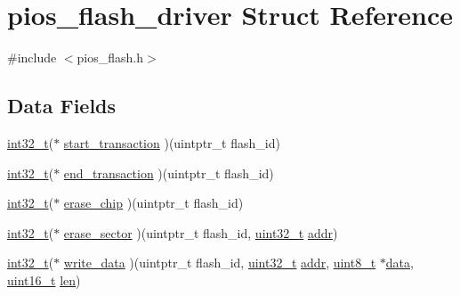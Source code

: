 \hypertarget{structpios__flash__driver}{\section{pios\-\_\-flash\-\_\-driver Struct Reference}
\label{structpios__flash__driver}
}


{\ttfamily \#include $<$pios\-\_\-flash.\-h$>$}

\subsection*{Data Fields}
\begin{DoxyCompactItemize}
\item 
\hyperlink{group___n_a_m_e_gafd12020da5a235dfcf0c3c748fb5baed}{int32\-\_\-t}($\ast$ \hyperlink{group___p_i_o_s___f_l_a_s_h_ga3128721bfc5d4b157f9c8866d10d80f0}{start\-\_\-transaction} )(uintptr\-\_\-t flash\-\_\-id)
\item 
\hyperlink{group___n_a_m_e_gafd12020da5a235dfcf0c3c748fb5baed}{int32\-\_\-t}($\ast$ \hyperlink{group___p_i_o_s___f_l_a_s_h_ga775db43adcb0c42ede668aef36016301}{end\-\_\-transaction} )(uintptr\-\_\-t flash\-\_\-id)
\item 
\hyperlink{group___n_a_m_e_gafd12020da5a235dfcf0c3c748fb5baed}{int32\-\_\-t}($\ast$ \hyperlink{group___p_i_o_s___f_l_a_s_h_ga38768b3295a563897e91191bfead95b5}{erase\-\_\-chip} )(uintptr\-\_\-t flash\-\_\-id)
\item 
\hyperlink{group___n_a_m_e_gafd12020da5a235dfcf0c3c748fb5baed}{int32\-\_\-t}($\ast$ \hyperlink{group___p_i_o_s___f_l_a_s_h_ga91676d432517e3a2ea7303a07cd1bde3}{erase\-\_\-sector} )(uintptr\-\_\-t flash\-\_\-id, \hyperlink{stdint_8h_a435d1572bf3f880d55459d9805097f62}{uint32\-\_\-t} \hyperlink{group___c_m_s_i_s___core___instruction_interface_gae5c31572d72f992f107a67f7c4e80d5b}{addr})
\item 
\hyperlink{group___n_a_m_e_gafd12020da5a235dfcf0c3c748fb5baed}{int32\-\_\-t}($\ast$ \hyperlink{group___p_i_o_s___f_l_a_s_h_ga019d8ac125523464c1068f1170852dd0}{write\-\_\-data} )(uintptr\-\_\-t flash\-\_\-id, \hyperlink{stdint_8h_a435d1572bf3f880d55459d9805097f62}{uint32\-\_\-t} \hyperlink{group___c_m_s_i_s___core___instruction_interface_gae5c31572d72f992f107a67f7c4e80d5b}{addr}, \hyperlink{stdint_8h_aba7bc1797add20fe3efdf37ced1182c5}{uint8\-\_\-t} $\ast$\hyperlink{pios__opahrs__proto_8h_a20e3f4bfaeccf09a75ef27e095a10112}{data}, \hyperlink{stdint_8h_a273cf69d639a59973b6019625df33e30}{uint16\-\_\-t} \hyperlink{mavlink__helpers_8h_aba59486c1504340293255a065b546e3a}{len})

\end{DoxyCompactItemize}
